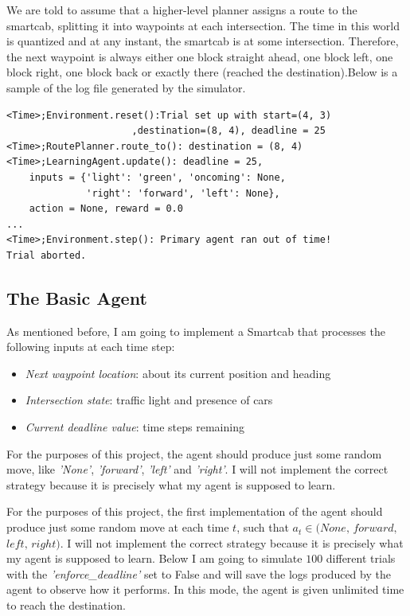 \documentclass[a4paper]{article}
\begin{document}
We are told to assume that a higher-level planner assigns a route to the smartcab, splitting it into waypoints at each intersection. The time in this world is quantized and at any instant, the smartcab is at some intersection. Therefore, the next waypoint is always either one block straight ahead, one block left, one block right, one block back or exactly there (reached the destination).Below is a sample of the log file generated by the simulator.

\begin{lstlisting}
<Time>;Environment.reset():Trial set up with start=(4, 3)
                      ,destination=(8, 4), deadline = 25
<Time>;RoutePlanner.route_to(): destination = (8, 4)
<Time>;LearningAgent.update(): deadline = 25,
    inputs = {'light': 'green', 'oncoming': None,
              'right': 'forward', 'left': None},
    action = None, reward = 0.0
...
<Time>;Environment.step(): Primary agent ran out of time!
Trial aborted.
\end{lstlisting}

\subsection{The Basic Agent}
As mentioned before, I am going to implement a Smartcab that processes the following inputs at each time step:

\begin{itemize}
\item \textit{Next waypoint location}: about its current position and heading
\item \textit{Intersection state}: traffic light and presence of cars
\item \textit{Current deadline value}: time steps remaining
\end{itemize}

For the purposes of this project, the agent should produce just some random move, like \textit{'None'}, \textit{'forward'}, \textit{'left'} and \textit{'right'}. I will not implement the correct strategy because it is precisely what my agent is supposed to learn.

For the purposes of this project, the first implementation of the agent should produce just some random move at each time $t$, such that $a_t \in (None,\, forward,\,$
$ left,\, right)$. I will not implement the correct strategy because it is precisely what my agent is supposed to learn. Below I am going to simulate $100$ different trials with the \textit{'enforce\_deadline'} set to False and will save the logs produced by the agent to observe how it performs. In this mode, the agent is given unlimited time to reach the destination.
\end{document}
